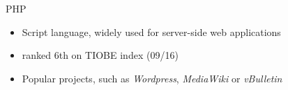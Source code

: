 \begin{frame}[t,plain]
	\titlepage
\end{frame}

\begin{frame}[t]{PHP}

	\begin{itemize}
	  \item Script language, widely used for server-side web applications
	  \item ranked 6th on TIOBE index (09/16)
	\end{itemize}
	\pause
	\begin{itemize}
	  \item Popular projects, such as \emph{Wordpress}, \emph{MediaWiki} or
	  \emph{vBulletin}
	\end{itemize}


\end{frame}
